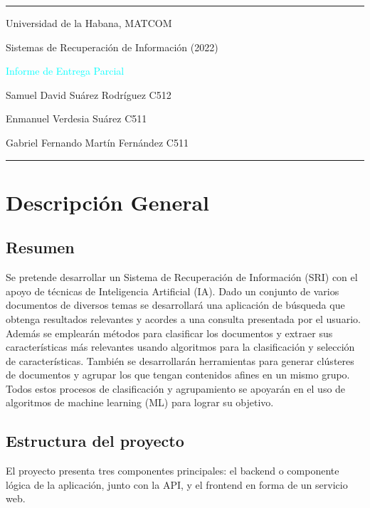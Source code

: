\documentclass[12pt]{llncs}
\begin{document}
\begin{center}
\large{
\rule{\textwidth}{0.5pt}
\par Universidad de la Habana, MATCOM
\par Sistemas de Recuperación de Información (2022)
\vspace{0.4cm}
\par \textcolor{cyan}{Informe de Entrega Parcial}
\par Samuel David Suárez Rodríguez C512
\par Enmanuel Verdesia Suárez C511
\par Gabriel Fernando Martín Fernández C511
\rule{\textwidth}{1.5pt}
}

\end{center}

\section{Descripción General}
\vspace{0.5cm}
\subsection{Resumen}
\par Se pretende desarrollar un Sistema de Recuperación de Información (SRI) con el apoyo de técnicas de Inteligencia Artificial (IA). Dado un conjunto de varios documentos de diversos temas se desarrollará una aplicación de búsqueda que obtenga resultados relevantes y acordes a una consulta presentada por el usuario. Además se emplearán métodos para clasificar los documentos y extraer sus características más relevantes usando algoritmos para la clasificación y selección de características. También se desarrollarán herramientas para generar clústeres de documentos y agrupar los que tengan contenidos afines en un mismo grupo. Todos estos procesos de clasificación y agrupamiento se apoyarán en el uso de algoritmos de machine learning (ML) para lograr su objetivo.

\subsection{Estructura del proyecto}
\par El proyecto presenta tres componentes principales: el backend o componente lógica de la aplicación, junto con la API, y el frontend en forma de un servicio web.
\end{document}
